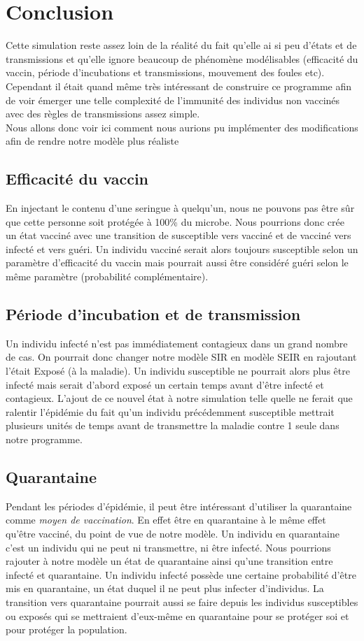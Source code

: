 \documentclass[journal, a4paper]{IEEEtran}
\begin{document}
\section{Conclusion}
Cette simulation reste assez loin de la réalité du fait qu'elle ai si peu d'états et de transmissions et qu'elle ignore beaucoup de phénomène modélisables (efficacité du vaccin, période d'incubations et transmissions, mouvement des foules etc). Cependant il était quand même très intéressant de construire ce programme afin de voir émerger une telle complexité de l'immunité des individus non vaccinés avec des règles de transmissions assez simple.\\
Nous allons donc voir ici comment nous aurions pu implémenter des modifications afin de rendre notre modèle plus réaliste
\subsection{Efficacité du vaccin}
En injectant le contenu d'une seringue à quelqu'un, nous ne pouvons pas être sûr que cette personne soit protégée à 100\% du microbe. Nous pourrions donc crée un état vacciné avec une transition de susceptible vers vacciné et de vacciné vers infecté et vers guéri. Un individu vacciné serait alors toujours susceptible selon un paramètre d'efficacité du vaccin mais pourrait aussi être considéré guéri selon le même paramètre (probabilité complémentaire).
\subsection{Période d'incubation et de transmission}
Un individu infecté n'est pas immédiatement contagieux dans un grand nombre de cas. On pourrait donc changer notre modèle SIR en modèle SEIR en rajoutant l'était Exposé (à la maladie). Un individu susceptible ne pourrait alors plus être infecté mais serait d'abord exposé un certain temps avant d'être infecté et contagieux. L'ajout de ce nouvel état à notre simulation telle quelle ne ferait que ralentir l'épidémie du fait qu'un individu précédemment susceptible mettrait plusieurs unités de temps avant de transmettre la maladie contre 1 seule dans notre programme.
\subsection{Quarantaine}
Pendant les périodes d'épidémie, il peut être intéressant d'utiliser la quarantaine comme \textit{moyen de vaccination}. En effet être en quarantaine à le même effet qu'être vacciné, du point de vue de notre modèle. Un individu en quarantaine c'est un individu qui ne peut ni transmettre, ni être infecté.
Nous pourrions rajouter à notre modèle un état de quarantaine ainsi qu'une transition entre infecté et quarantaine. Un individu infecté possède une certaine probabilité d'être mis en quarantaine, un état duquel il ne peut plus infecter d'individus. La transition vers quarantaine pourrait aussi se faire depuis les individus susceptibles ou exposés qui se mettraient d'eux-même en quarantaine pour se protéger soi et pour protéger la population.
\end{document}
